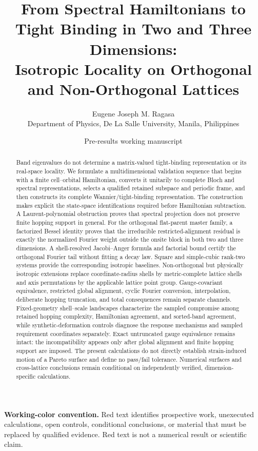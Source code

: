 \documentclass[11pt]{article}
\title{\textbf{From Spectral Hamiltonians to Tight Binding in Two and Three Dimensions:\\
Isotropic Locality on Orthogonal and Non-Orthogonal Lattices}}
\author{Eugene Joseph M. Ragasa\\
Department of Physics, De La Salle University, Manila, Philippines}
\date{Pre-results working manuscript}
\newenvironment{prospective}{\color{prospectivered}}{}
\newcommand{\futurework}[1]{\textcolor{prospectivered}{#1}}
\begin{document}
\maketitle

\begin{prospective}
\noindent\textbf{Working-color convention.} Red text identifies prospective work,
unexecuted calculations, open controls, conditional conclusions, or material that must
be replaced by qualified evidence. Red text is not a numerical result or scientific
claim.
\end{prospective}

\begin{abstract}
Band eigenvalues do not determine a matrix-valued tight-binding representation or its
real-space locality. We formulate a multidimensional validation sequence that begins
with a finite cell--orbital Hamiltonian, converts it unitarily to complete Bloch and
spectral representations, selects a qualified retained subspace and periodic frame, and
then constructs its complete Wannier/tight-binding representation. The construction
makes explicit the state-space identifications required before Hamiltonian subtraction.
A Laurent-polynomial obstruction proves that spectral projection does not preserve
finite hopping support in general. For the orthogonal flat-parent master family, a
factorized Bessel identity proves that the irreducible restricted-alignment residual is
exactly the normalized Fourier weight outside the onsite block in both two and three
dimensions. A shell-resolved Jacobi--Anger formula and factorial bound certify the
orthogonal Fourier tail without fitting a decay law. Square and simple-cubic rank-two
systems provide the corresponding isotropic baselines.
Non-orthogonal but physically isotropic extensions replace coordinate-radius shells by
metric-complete lattice shells and axis permutations by the applicable lattice point
group. Gauge-covariant equivalence, restricted global alignment, cyclic Fourier
conversion, interpolation, deliberate hopping truncation, and total consequences remain
separate channels. Fixed-geometry shell--scale landscapes characterize the sampled
compromise among retained hopping complexity, Hamiltonian agreement, and sorted-band
agreement, while synthetic-deformation controls diagnose the response mechanisms and
sampled requirement coordinates separately. Exact untruncated gauge equivalence remains
intact: the incompatibility appears only after global alignment and finite hopping
support are imposed. The present calculations do not directly establish strain-induced
motion of a Pareto surface and define no pass/fail tolerance.
\futurework{Numerical surfaces and cross-lattice conclusions remain conditional on
independently verified, dimension-specific calculations.}
\end{abstract}
\end{document}
